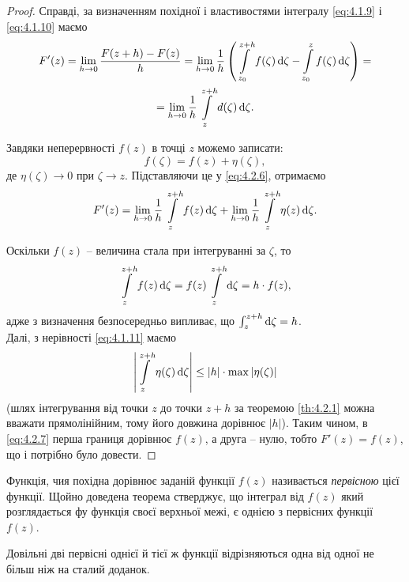 \begin{proof}
Справді, за визначенням похідної і властивостями інтегралу \eqref{eq:4.1.9} і \eqref{eq:4.1.10} маємо
\begin{multline}
\label{eq:4.2.6}
F'(z) = \displaystyle\lim\limits_{h \to 0} \dfrac{F(z + h) - F(z)}{h} = \displaystyle\lim\limits_{h \to 0} \dfrac{1}{h} \left( \displaystyle\int\limits_{z_0}^{z + h} f(\zeta) \mathop{}\!\mathrm{d} \zeta - \displaystyle\int\limits_{z_0}^z f(\zeta) \mathop{}\!\mathrm{d} \zeta \right) = \\
= \displaystyle\lim\limits_{h \to 0} \dfrac{1}{h} \displaystyle\int\limits_z^{z + h} d(\zeta) \mathop{}\!\mathrm{d} \zeta.
\end{multline}

Завдяки неперервності $f(z)$ в точці $z$ можемо записати:
\begin{equation*}
f(\zeta) = f(z) + \eta (\zeta),
\end{equation*}
де $\eta(\zeta) \to 0$ при $\zeta \to z$. Підставляючи це у \eqref{eq:4.2.6}, отримаємо
\begin{equation}
\label{eq:4.2.7}
F'(z) = \displaystyle\lim\limits_{h \to 0} \dfrac{1}{h} \displaystyle\int\limits_z^{z + h} f(z) \mathop{}\!\mathrm{d} \zeta + \displaystyle\lim\limits_{h \to 0} \dfrac{1}{h} \displaystyle\int\limits_z^{z + h} \eta(z) \mathop{}\!\mathrm{d} \zeta.
\end{equation}

Оскільки $f(z)$ -- величина стала при інтегруванні за $\zeta$, то
\begin{equation}
	\label{eq:4.2.8}
	\displaystyle\int\limits_z^{z + h} f(z) \mathop{}\!\mathrm{d} \zeta = f(z) \displaystyle\int\limits_z^{z + h} \mathop{}\!\mathrm{d} \zeta = h \cdot f(z),
\end{equation}
адже з визначення безпосередньо випливає, що $\int_z^{z + h} \mathop{}\!\mathrm{d} \zeta = h$. \\

Далі, з нерівності \eqref{eq:4.1.11} маємо
\begin{equation}
	\label{eq:4.2.9}
	\left| \displaystyle\int\limits_z^{z + h} \eta(\zeta) \mathop{}\!\mathrm{d} \zeta \right| \le |h| \cdot \displaystyle\max\limits |\eta(\zeta)|
\end{equation}
(шлях інтегрування від точки $z$ до точки $z + h$ за теоремою \ref{th:4.2.1} можна вважати прямолінійним, тому його довжина дорівнює $|h|$). Таким чином, в \eqref{eq:4.2.7} перша границя дорівнює $f(z)$, а друга -- нулю, тобто $F'(z) = f(z)$, що і потрібно було довести.
\end{proof}

Функція, чия похідна дорівнює заданій функції $f(z)$ називається \textit{первісною} цієї функції. Щойно доведена теорема стверджує, що інтеграл від $f(z)$ який розглядається фу функція своєї верхньої межі, є однією з первісних функції $f(z)$.

\begin{theorem}
	\label{th:4.2.3}
	Довільні дві первісні однієї й тієї ж функції відрізняються одна від одної не більш ніж на сталий доданок.
\end{theorem}

